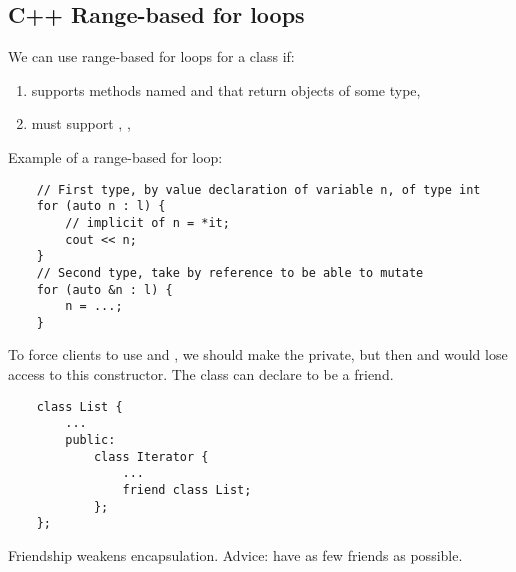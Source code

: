 \subsection{C++ Range-based for loops}
We can use range-based for loops for a class  if:
\begin{enumerate}[label=(\arabic*)]
    \item {} supports methods named  and 
          that return objects of some type, 
    \item {} must support \code{!=}, \code{++}, \code{*}
\end{enumerate}
Example of a range-based for loop:
\begin{lstlisting}
    // First type, by value declaration of variable n, of type int
    for (auto n : l) {
        // implicit of n = *it;
        cout << n;
    }
    // Second type, take by reference to be able to mutate
    for (auto &n : l) {
        n = ...;
    }
\end{lstlisting}

To force clients to use  and , we should make the
 private, but then  and 
would lose access to this constructor. The  class can declare
 to be a friend.
\begin{lstlisting}
    class List {
        ...
        public:
            class Iterator {
                ...
                friend class List;
            };
    };
\end{lstlisting}
Friendship weakens encapsulation. Advice: have as few friends as possible.
